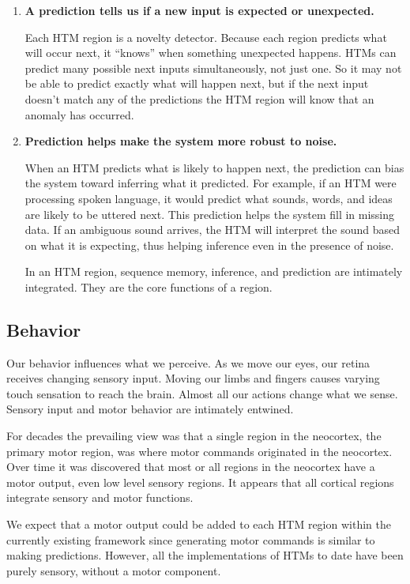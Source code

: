 \documentclass{report}
\begin{document}
\begin{enumerate}
\item {\bf A prediction tells us if a new input is expected or unexpected.}

Each HTM region is a novelty detector. Because each region predicts
what will occur next, it ``knows'' when something unexpected
happens. HTMs can predict many possible next inputs simultaneously,
not just one. So it may not be able to predict exactly what will
happen next, but if the next input doesn't match any of the
predictions the HTM region will know that an anomaly has occurred.

\item {\bf Prediction helps make the system more robust to noise.}

When an HTM predicts what is likely to happen next, the prediction can
bias the system toward inferring what it predicted. For example, if an
HTM were processing spoken language, it would predict what sounds,
words, and ideas are likely to be uttered next. This prediction helps
the system fill in missing data. If an ambiguous sound arrives, the
HTM will interpret the sound based on what it is expecting, thus
helping inference even in the presence of noise.

In an HTM region, sequence memory, inference, and prediction are
intimately integrated. They are the core functions of a region.

\end{enumerate}

\subsection*{Behavior}

Our behavior influences what we perceive. As we move our eyes, our
retina receives changing sensory input. Moving our limbs and fingers
causes varying touch sensation to reach the brain. Almost all our
actions change what we sense. Sensory input and motor behavior are
intimately entwined.

For decades the prevailing view was that a single region in the
neocortex, the primary motor region, was where motor commands
originated in the neocortex. Over time it was discovered that most or
all regions in the neocortex have a motor output, even low level
sensory regions. It appears that all cortical regions integrate
sensory and motor functions.

We expect that a motor output could be added to each HTM region within
the currently existing framework since generating motor commands is
similar to making predictions. However, all the implementations of
HTMs to date have been purely sensory, without a motor component.
\end{document}
